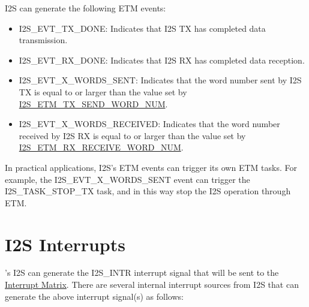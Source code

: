 \documentclass[main\_\_EN.tex]{subfiles}
\begin{document}
I2S can generate the following ETM events:

\begin{itemize}
    \item \label{evt:I2SEVTTXDONE}I2S\_EVT\_TX\_DONE: Indicates that I2S TX has completed data transmission.
    \item \label{evt:I2SEVTRXDONE}I2S\_EVT\_RX\_DONE: Indicates that I2S RX has completed data reception.
    \item \label{evt:I2SEVTXWORDSSENT}I2S\_EVT\_X\_WORDS\_SENT: Indicates that the word number sent by I2S TX is equal to or larger than the value set by \hyperref[fielddesc:I2SETMTXSENDWORDNUM]{I2S\_ETM\_TX\_SEND\_WORD\_NUM}.
    \item \label{evt:I2SEVTXWORDSRECEIVED}I2S\_EVT\_X\_WORDS\_RECEIVED: Indicates that the word number received by I2S RX is equal to or larger than the value set by \hyperref[fielddesc:I2SETMRXRECEIVEWORDNUM]{I2S\_ETM\_RX\_RECEIVE\_WORD\_NUM}.
\end{itemize}

In practical applications, I2S's ETM events can trigger its own ETM tasks. For example, the I2S\_EVT\_X\_WORDS\_SENT event can trigger the I2S\_TASK\_STOP\_TX task, and in this way stop the I2S operation through ETM.



\section{I2S Interrupts} \label{sec:i2s-interrupts}

\chipname{}'s I2S can generate the I2S\_INTR interrupt signal that will be sent to the \hyperref[mod:intmtrx]{Interrupt Matrix}. There are several internal interrupt sources from I2S  that can generate the above interrupt signal(s) as follows:
\end{document}
